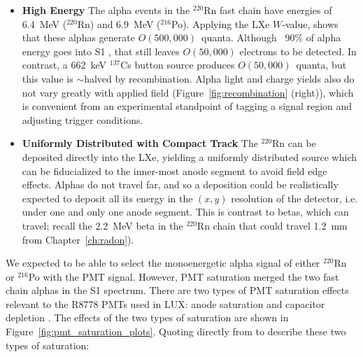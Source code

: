 \begin{itemize}
\item \textbf{High Energy} The alpha events in the $^{220}$Rn fast chain have energies of 6.4~MeV ($^{220}$Rn)  and 6.9~MeV ($^{216}$Po). Applying the \ac{LXe} $W$-value, shows that these alphas generate $O(500,000)$~quanta. Although ~90\% of alpha energy goes into S1 \cite{Aprile2010}, that still leaves $O(50,000)$ electrons to be detected. In contrast, a 662~keV $^{137}$Cs button source produces $O(50,000)$~quanta, but this value is $\sim$halved by recombination. Alpha light and charge yields also do not vary greatly with applied field (Figure~\ref{fig:recombination} (right)), which is convenient from an experimental standpoint of tagging a signal region and adjusting trigger conditions.  
\item \textbf{Uniformly Distributed with Compact Track} The $^{220}$Rn can be deposited directly into the \ac{LXe}, yielding a uniformly distributed source which can be fiducialized to the inner-most anode segment to avoid field edge effects. Alphas do not travel far, and so a deposition could be realistically expected to deposit all its energy in the $(x,y)$ resolution of the detector, i.e. under one and only one anode segment. This is contrast to betas, which can travel; recall the 2.2~MeV beta in the $^{220}$Rn chain that could travel 1.2~mm from Chapter~\ref{ch:radon}).
\end{itemize}

We expected to be able to select the monoenergetic alpha signal of either $^{220}$Rn or $^{216}$Po with the \ac{PMT} signal. However, \ac{PMT} saturation merged the two fast chain alphas in the S1 spectrum. There are two types of \ac{PMT} saturation effects relevant to the R8778 \ac{PMT}s used in \ac{LUX}: anode saturation and capacitor depletion \cite{Faham2014a}. The effects of the two types of saturation are shown in Figure~\ref{fig:pmt_saturation_plots}. Quoting directly from \cite{Faham2014a} to describe these two types of saturation:

